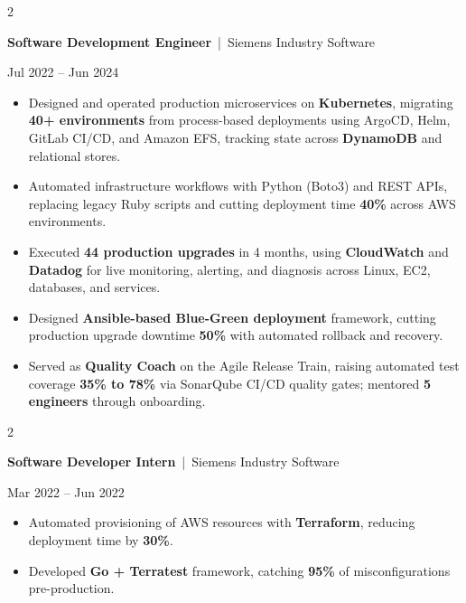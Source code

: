 \documentclass[10pt, letterpaper]{article}
\newenvironment{highlights}{
    \begin{itemize}[
        topsep=0.10 cm,
        parsep=0.06 cm,
        partopsep=0pt,
        itemsep=0.06 cm,
        leftmargin=12pt
    ]
}{
    \end{itemize}
}
\newenvironment{twocolentry}[2][]{
    \onecolentry
    \def\secondColumn{#2}
    \setcolumnwidth{\fill, 4.5 cm}
    \begin{paracol}{2}
}{
    \switchcolumn \raggedleft \secondColumn
    \end{paracol}
    \endonecolentry
}
\begin{document}
\vspace{0.15 cm}

\begin{twocolentry}{Jul 2022 -- Jun 2024}
\textbf{Software Development Engineer} \,|\, Siemens Industry Software
\end{twocolentry}
\begin{highlights}
  \item Designed and operated production microservices on \textbf{Kubernetes}, migrating \textbf{40+ environments} from process-based deployments using ArgoCD, Helm, GitLab CI/CD, and Amazon EFS, tracking state across \textbf{DynamoDB} and relational stores.
  \item Automated infrastructure workflows with Python (Boto3) and REST APIs, replacing legacy Ruby scripts and cutting deployment time \textbf{40\%} across AWS environments.
  \item Executed \textbf{44 production upgrades} in 4 months, using \textbf{CloudWatch} and \textbf{Datadog} for live monitoring, alerting, and diagnosis across Linux, EC2, databases, and services.
  \item Designed \textbf{Ansible-based Blue-Green deployment} framework, cutting production upgrade downtime \textbf{50\%} with automated rollback and recovery.
  \item Served as \textbf{Quality Coach} on the Agile Release Train, raising automated test coverage \textbf{35\% to 78\%} via SonarQube CI/CD quality gates; mentored \textbf{5 engineers} through onboarding.
\end{highlights}

\vspace{0.15 cm}

\begin{twocolentry}{Mar 2022 -- Jun 2022}
\textbf{Software Developer Intern} \,|\, Siemens Industry Software
\end{twocolentry}
\begin{highlights}
  \item Automated provisioning of AWS resources with \textbf{Terraform}, reducing deployment time by \textbf{30\%}.
  \item Developed \textbf{Go + Terratest} framework, catching \textbf{95\%} of misconfigurations pre-production.
\end{highlights}

\end{document}
